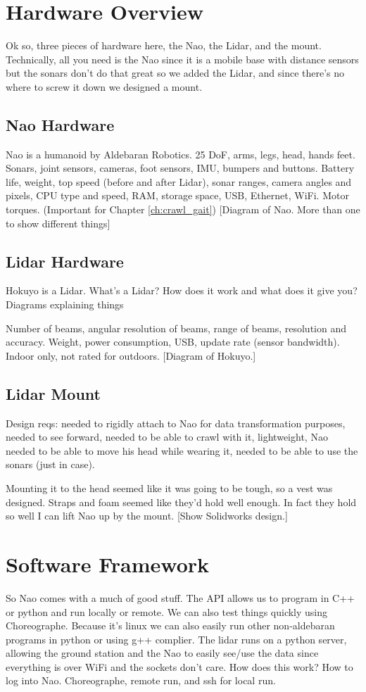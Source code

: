 \section{Hardware Overview}
Ok so, three pieces of hardware here, the Nao, the Lidar, and the mount.
Technically, all you need is the Nao since it is a mobile base with distance sensors but the sonars
don't do that great so we added the Lidar, and since there's no where to screw it down we designed a mount.

\subsection{Nao Hardware}
Nao is a humanoid by Aldebaran Robotics. 25 DoF, arms, legs, head, hands feet. Sonars, joint sensors, cameras,
foot sensors, IMU, bumpers and buttons. Battery life, weight, top speed (before and after Lidar), sonar ranges, camera angles and pixels,
CPU type and speed, RAM, storage space, USB, Ethernet, WiFi.
Motor torques. (Important for Chapter \ref{ch:crawl_gait})
[Diagram of Nao. More than one to show different things]

\subsection{Lidar Hardware}
Hokuyo is a Lidar. What's a Lidar? How does it work and what does it give you? 
{Diagrams explaining things}

Number of beams, angular resolution of beams, range of beams, resolution and accuracy.
Weight, power consumption, USB, update rate (sensor bandwidth).
Indoor only, not rated for outdoors.
[Diagram of Hokuyo.]

\subsection{Lidar Mount}
Design reqs: needed to rigidly attach to Nao for data transformation purposes, needed to see forward,
needed to be able to crawl with it, lightweight, Nao needed to be able to move his head while wearing it,
needed to be able to use the sonars (just in case).

Mounting it to the head seemed like it was going to be tough, so a vest was designed.
Straps and foam seemed like they'd hold well enough. In fact they hold so well I can lift Nao up by the mount.
[Show Solidworks design.]

\section{Software Framework}
So Nao comes with a much of good stuff. The API allows us to program in C++ or python and run locally or
remote. We can also test things quickly using Choreographe. Because it's linux we can also easily
run other non-aldebaran programs in python or using g++ complier.
The lidar runs on a python server, allowing the ground station and the Nao to easily see/use the data since
everything is over WiFi and the sockets don't care. How does this work?
How to log into Nao. Choreographe, remote run, and ssh for local run.

